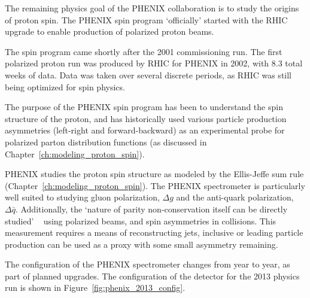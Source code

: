 The remaining physics goal of the PHENIX collaboration is to study the origins
of proton spin. The PHENIX spin program `officially' started with the RHIC
upgrade to enable production of polarized proton beams. 

The spin program came shortly after the 2001 commissioning run. The first
polarized proton run was produced by RHIC for PHENIX in 2002, with 8.3 total
weeks of data. Data was taken over several discrete periods, as RHIC was still
being optimized for spin physics.

The purpose of the PHENIX spin program has been to understand the spin
structure of the proton, and has historically used various particle production
asymmetries (left-right and forward-backward) as an experimental probe for
polarized parton distribution functions (as discussed in
Chapter~\ref{ch:modeling_proton_spin}). 

PHENIX studies the proton spin structure as modeled by the Ellis-Jeffe sum rule
(Chapter~\ref{ch:modeling_proton_spin}). The PHENIX spectrometer is
particularly well suited to studying gluon polarization, $\Delta g$ and the
anti-quark polarization, $\Delta \bar{q}$. Additionally, the `nature of parity
non-conservation itself can be directly studied'
~\cite{PHENIXCollaboration1998} using polarized beams, and spin asymmetries in
collisions.  This measurement requires a means of reconstructing jets,
inclusive or leading particle production can be used as a proxy with some small
asymmetry remaining.

The configuration of the PHENIX spectrometer changes from year to year, as part
of planned upgrades. The configuration of the detector for the 2013 physics run
is shown in Figure~\ref{fig:phenix_2013_config}.

